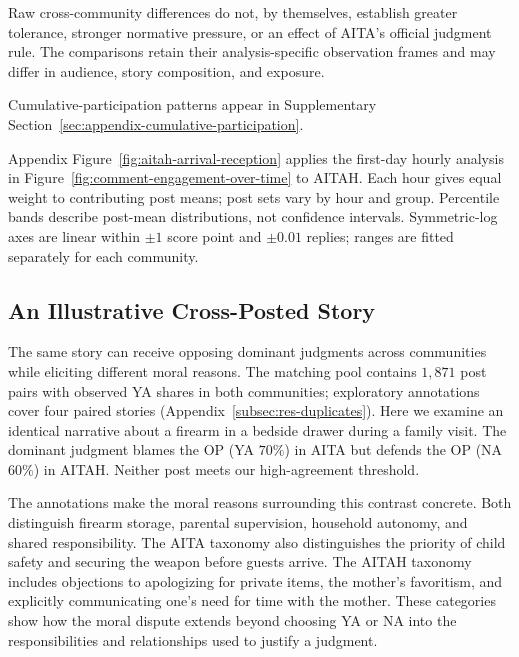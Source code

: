 Raw cross-community differences do not, by themselves, establish greater
tolerance, stronger normative pressure, or an effect of AITA's official judgment
rule. The comparisons retain their analysis-specific observation frames
and may differ in audience, story composition, and exposure.

Cumulative-participation patterns appear in
Supplementary Section~\ref{sec:appendix-cumulative-participation}.

Appendix Figure~\ref{fig:aitah-arrival-reception} applies the first-day hourly
analysis in Figure~\ref{fig:comment-engagement-over-time} to AITAH.
Each hour gives equal weight to contributing post means; post sets vary
by hour and group. Percentile bands describe
post-mean distributions, not confidence intervals. Symmetric-log axes
are linear within $\pm1$ score point and $\pm0.01$ replies; ranges
are fitted separately for each community.


\subsection{An Illustrative Cross-Posted Story}
\label{subsec:supp-cross-posted-case}

The same story can receive opposing dominant judgments across communities
while eliciting different moral reasons. The matching pool contains
$1{,}871$ post pairs with observed YA shares in both communities; exploratory
annotations cover four paired stories
(Appendix~\ref{subsec:res-duplicates}). Here we examine an identical
narrative about a firearm in a bedside drawer during a family visit.
The dominant judgment blames the OP (YA $70\%$) in AITA but defends the
OP (NA $60\%$) in AITAH. Neither post meets our high-agreement threshold.

The annotations make the moral reasons surrounding this contrast
concrete. Both distinguish firearm storage, parental supervision,
household autonomy, and shared responsibility. The AITA taxonomy also
distinguishes the priority of child safety and securing the weapon before
guests arrive. The AITAH taxonomy includes objections to apologizing for
private items, the mother's favoritism, and explicitly communicating
one's need for time with the mother. These categories show how the moral dispute extends beyond choosing YA or NA
into the responsibilities and relationships used to justify a judgment.

